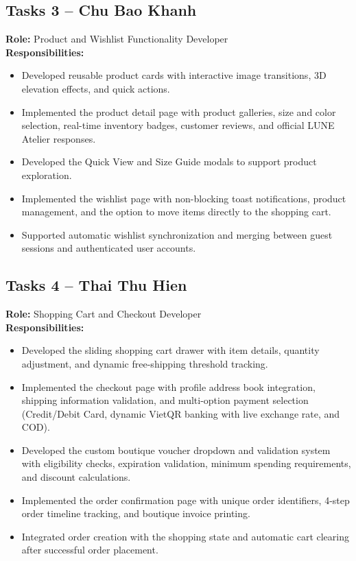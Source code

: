 \documentclass[12pt,a4paper,oneside]{report}
\begin{document}
\subsection{Tasks 3 -- Chu Bao Khanh}
\textbf{Role:} Product and Wishlist Functionality Developer\\
\textbf{Responsibilities:}
\begin{itemize}[leftmargin=1.2cm]
    \item Developed reusable product cards with interactive image transitions, 3D elevation effects, and quick actions.
    \item Implemented the product detail page with product galleries, size and color selection, real-time inventory badges, customer reviews, and official LUNE Atelier responses.
    \item Developed the Quick View and Size Guide modals to support product exploration.
    \item Implemented the wishlist page with non-blocking toast notifications, product management, and the option to move items directly to the shopping cart.
    \item Supported automatic wishlist synchronization and merging between guest sessions and authenticated user accounts.
\end{itemize}

\subsection{Tasks 4 -- Thai Thu Hien}
\textbf{Role:} Shopping Cart and Checkout Developer\\
\textbf{Responsibilities:}
\begin{itemize}[leftmargin=1.2cm]
    \item Developed the sliding shopping cart drawer with item details, quantity adjustment, and dynamic free-shipping threshold tracking.
    \item Implemented the checkout page with profile address book integration, shipping information validation, and multi-option payment selection (Credit/Debit Card, dynamic VietQR banking with live exchange rate, and COD).
    \item Developed the custom boutique voucher dropdown and validation system with eligibility checks, expiration validation, minimum spending requirements, and discount calculations.
    \item Implemented the order confirmation page with unique order identifiers, 4-step order timeline tracking, and boutique invoice printing.
    \item Integrated order creation with the shopping state and automatic cart clearing after successful order placement.
\end{itemize}
\end{document}
